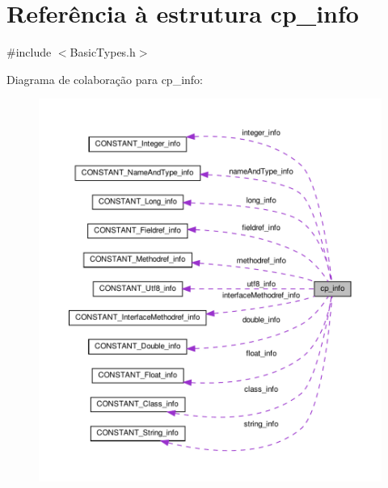 \hypertarget{structcp__info}{}\section{Referência à estrutura cp\+\_\+info}
\label{structcp__info}


{\ttfamily \#include $<$Basic\+Types.\+h$>$}



Diagrama de colaboração para cp\+\_\+info\+:
\nopagebreak
\begin{figure}[H]
\begin{center}
\leavevmode
\includegraphics[width=350pt]{structcp__info__coll__graph}
\end{center}
\end{figure}
